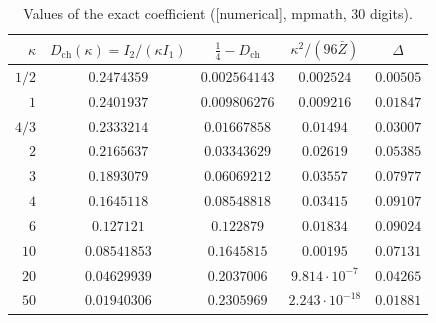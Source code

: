 \documentclass[11pt,a4paper]{article}
\theoremstyle{remark}
\theoremstyle{definition}
\theoremstyle{plain}
\theoremstyle{remark}
\newcommand{\st}[1]{\textsf{[#1]}}
\newcommand{\Zb}{\bar Z}
\newcommand{\Dch}{D_{\mathrm{ch}}}
\begin{document}
\begin{table}[htbp]
\centering\small
\begin{tabular}{rcccc}
\toprule
$\kappa$ & $\Dch(\kappa)=I_2/(\kappa I_1)$ & $\frac14-\Dch$ & $\kappa^2/(96\Zb)$ & $\Delta$\\
\midrule
$1/2$ & $0.2474359$ & $0.002564143$ & $0.002524$ & $0.00505$ \\
$1$ & $0.2401937$ & $0.009806276$ & $0.009216$ & $0.01847$ \\
$4/3$ & $0.2333214$ & $0.01667858$ & $0.01494$ & $0.03007$ \\
$2$ & $0.2165637$ & $0.03343629$ & $0.02619$ & $0.05385$ \\
$3$ & $0.1893079$ & $0.06069212$ & $0.03557$ & $0.07977$ \\
$4$ & $0.1645118$ & $0.08548818$ & $0.03415$ & $0.09107$ \\
$6$ & $0.127121$ & $0.122879$ & $0.01834$ & $0.09024$ \\
$10$ & $0.08541853$ & $0.1645815$ & $0.00195$ & $0.07131$ \\
$20$ & $0.04629939$ & $0.2037006$ & $9.814\cdot10^{-7}$ & $0.04265$ \\
$50$ & $0.01940306$ & $0.2305969$ & $2.243\cdot10^{-18}$ & $0.01881$ \\
\bottomrule
\end{tabular}
\caption{Values of the exact coefficient (\st{numerical}, mpmath, $30$ digits).}
\label{tab:values}
\end{table}
\end{document}
